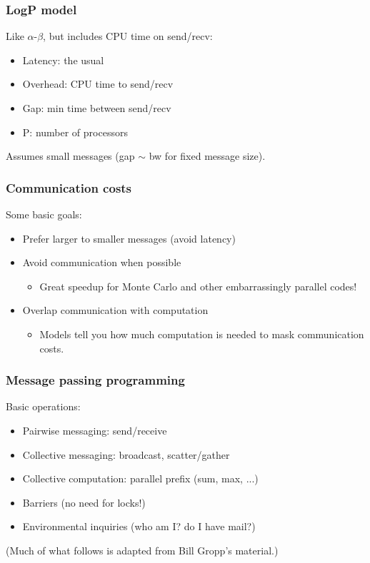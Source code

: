 \documentclass{beamer}
\begin{document}
\begin{frame}
  \frametitle{LogP model}
  
  Like $\alpha$-$\beta$, but includes CPU time on send/recv:
  \begin{itemize}
  \item Latency: the usual
  \item Overhead: CPU time to send/recv
  \item Gap: min time between send/recv
  \item P: number of processors
  \end{itemize}
  Assumes small messages (gap $\sim$ bw for fixed message size).
\end{frame}


\begin{frame}
  \frametitle{Communication costs}

  Some basic goals:
  \begin{itemize}
  \item Prefer larger to smaller messages (avoid latency)
  \item Avoid communication when possible
    \begin{itemize}
    \item Great speedup for Monte Carlo and other embarrassingly parallel codes!
    \end{itemize}
  \item Overlap communication with computation
    \begin{itemize}
    \item Models tell you how much computation is needed to mask
      communication costs.
    \end{itemize}
  \end{itemize}
\end{frame}


\begin{frame}
  \frametitle{Message passing programming}
  
  Basic operations:
  \begin{itemize}
  \item Pairwise messaging: send/receive
  \item Collective messaging: broadcast, scatter/gather
  \item Collective computation: parallel prefix (sum, max, ...)
  \item Barriers (no need for locks!)
  \item Environmental inquiries (who am I? do I have mail?)
  \end{itemize}
  (Much of what follows is adapted from Bill Gropp's material.)
\end{frame}
\end{document}
